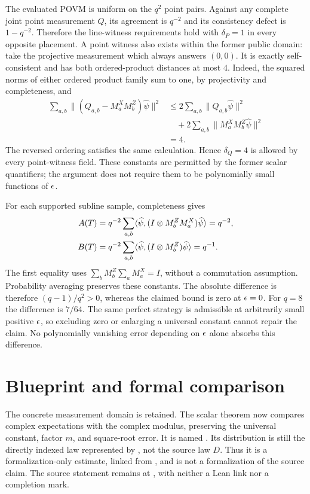 \documentclass[11pt]{article}
\begin{document}
The evaluated POVM is uniform on the $q^2$ point pairs. Against any complete
joint point measurement $Q$, its agreement is $q^{-2}$ and its consistency
defect is $1-q^{-2}$. Therefore the line-witness requirements hold with
$\delta_P=1$ in every opposite placement. A point witness also exists within
the former public domain: take the projective measurement which always
answers $(0,0)$. It is exactly self-consistent and has both ordered-product
distances at most $4$. Indeed, the squared norms of either ordered product
family sum to one, by projectivity and completeness, and
\begin{align*}
 \sum_{a,b}\|(Q_{a,b}-M^X_aM^Z_b)\widehat\psi\|^2
 &\leq 2\sum_{a,b}\|Q_{a,b}\widehat\psi\|^2\\
 &\quad+2\sum_{a,b}\|M^X_aM^Z_b\widehat\psi\|^2\\
 &=4.
\end{align*}
The reversed ordering satisfies the same calculation. Hence $\delta_Q=4$
is allowed by every point-witness field. These constants are permitted by
the former scalar quantifiers; the argument does not require them to be
polynomially small functions of $\epsilon$.

For each supported subline sample, completeness gives
\begin{align*}
 A(T)&=q^{-2}\sum_{a,b}\langle\widehat\psi,
    (I\otimes M^Z_bM^X_a)\widehat\psi\rangle=q^{-2},\\
 B(T)&=q^{-2}\sum_{a,b}\langle\widehat\psi,
    (I\otimes M^Z_b)\widehat\psi\rangle=q^{-1}.
\end{align*}
The first equality uses $\sum_bM^Z_b\sum_aM^X_a=I$, without a commutation
assumption. Probability averaging preserves these constants. The absolute
difference is therefore $(q-1)/q^2>0$, whereas the claimed bound is zero at
$\epsilon=0$. For $q=8$ the difference is $7/64$. The same perfect strategy is
admissible at arbitrarily small positive $\epsilon$, so excluding zero or
enlarging a universal constant cannot repair the claim. No polynomially
vanishing error depending on $\epsilon$ alone absorbs this difference.

\section{Blueprint and formal comparison}

The concrete measurement domain is retained. The scalar theorem now
compares complex expectations with the complex modulus, preserving the
universal constant, factor $m$, and square-root error. It is named
. Its distribution is still the
directly indexed law represented by , not the
source law $D$. Thus it is a formalization-only estimate, linked from
, and is not a formalization of the source
claim. The source statement remains at , with neither
a Lean link nor a completion mark.
\end{document}
